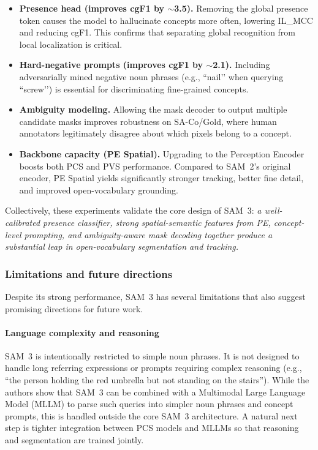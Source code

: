\begin{enrichment}
\begin{enrichment}
		\begin{itemize}
			\item \textbf{Presence head (improves cgF1 by $\sim$3.5).}  
			Removing the global presence token causes the model to hallucinate concepts more often, lowering IL\_MCC and reducing cgF1. This confirms that separating global recognition from local localization is critical.
			\item \textbf{Hard-negative prompts (improves cgF1 by $\sim$2.1).}  
			Including adversarially mined negative noun phrases (e.g., “nail’’ when querying “screw’’) is essential for discriminating fine-grained concepts.
			\item \textbf{Ambiguity modeling.}  
			Allowing the mask decoder to output multiple candidate masks improves robustness on SA-Co/Gold, where human annotators legitimately disagree about which pixels belong to a concept.
			\item \textbf{Backbone capacity (PE Spatial).}  
			Upgrading to the Perception Encoder boosts both PCS and PVS performance. Compared to SAM~2’s original encoder, PE Spatial yields significantly stronger tracking, better fine detail, and improved open-vocabulary grounding.
		\end{itemize}
		
		Collectively, these experiments validate the core design of SAM~3:  
		\emph{a well-calibrated presence classifier, strong spatial-semantic features from PE, concept-level prompting, and ambiguity-aware mask decoding together produce a substantial leap in open-vocabulary segmentation and tracking.}
		
		\subsubsection{Limitations and future directions}
		\label{subsubsec:chapter15_sam3_limitations}
		
		Despite its strong performance, SAM~3 has several limitations that also suggest promising directions for future work.
		
		\paragraph{Language complexity and reasoning}
		
		SAM~3 is intentionally restricted to simple noun phrases. It is not designed to handle long referring expressions or prompts requiring complex reasoning (e.g., ``the person holding the red umbrella but not standing on the stairs''). While the authors show that SAM~3 can be combined with a Multimodal Large Language Model (MLLM) to parse such queries into simpler noun phrases and concept prompts, this is handled outside the core SAM~3 architecture. A natural next step is tighter integration between PCS models and MLLMs so that reasoning and segmentation are trained jointly.
		

\end{enrichment}
\end{enrichment}
